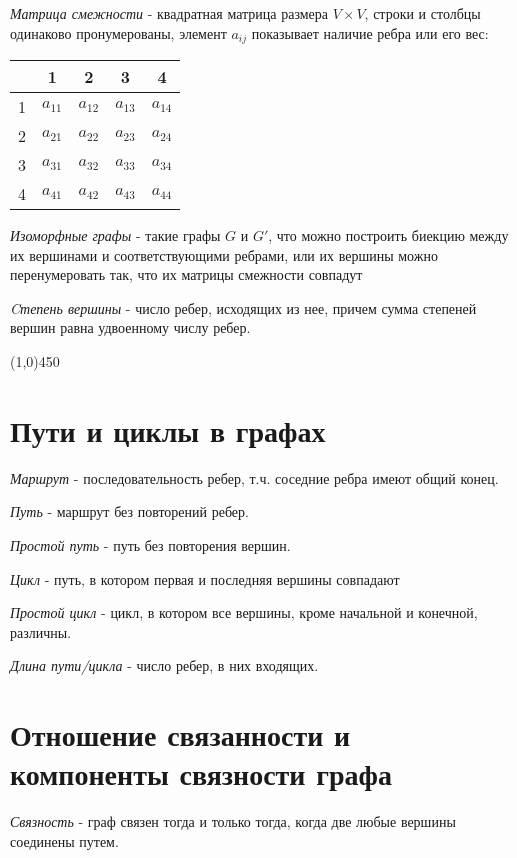 \documentclass[a4paper,12pt]{article}
\begin{document}
	\textit{Матрица смежности} - квадратная матрица размера $V \times V$, строки и столбцы одинаково пронумерованы, элемент $a_{ij}$ показывает наличие ребра или его вес:
	\begin{center}
		\begin{tabular}{c|c|c|c|c}
			&1	&2	&3	&4 	\\ \hline
			1	&$a_{11}$	&$a_{12}$	&$a_{13}$	&$a_{14}$ \\ \hline
			2	&$a_{21}$	&$a_{22}$	&$a_{23}$	&$a_{24}$	\\ \hline
			3	&$a_{31}$	&$a_{32}$	&$a_{33}$	&$a_{34}$	\\ \hline
			4	&$a_{41}$	&$a_{42}$	&$a_{43}$	&$a_{44}$
		\end{tabular}
	\end{center}



	\textit{Изоморфные графы} - такие графы $G$ и $G'$, что можно построить биекцию между их вершинами и соответствующими ребрами, или их вершины можно перенумеровать так, что их матрицы смежности совпадут

	\textit{Cтепень вершины} - число ребер, исходящих из нее, причем сумма степеней вершин равна удвоенному числу ребер.

	\begin{center}
		\line(1,0){450}
	\end{center}

	\section*{Пути и циклы в графах}
	\textit{Маршрут} - последовательность ребер, т.ч. соседние ребра имеют общий конец.

	\textit{Путь} - маршрут без повторений ребер.

	\textit{Простой путь} - путь без повторения вершин.

	\textit{Цикл} - путь, в котором первая и последняя вершины совпадают

	\textit{Простой цикл} - цикл, в котором все вершины, кроме начальной и конечной, различны.

	\textit{Длина пути/цикла} - число ребер, в них входящих.

	\section*{Отношение связанности и компоненты связности графа}
	\textit{Связность} - граф связен тогда и только тогда, когда две любые вершины соединены путем.
\end{document}
